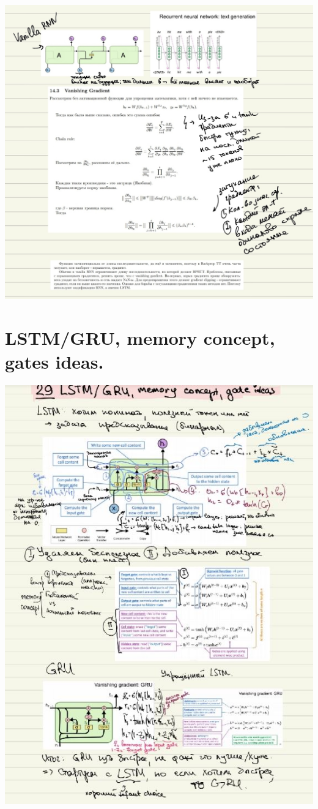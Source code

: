 \includegraphics[width=400pt]{images/28_2.JPG}
\newpage

\section{LSTM/GRU, memory concept, gates ideas.}
\includegraphics[width=450pt]{images/29.JPG}
\newpage


